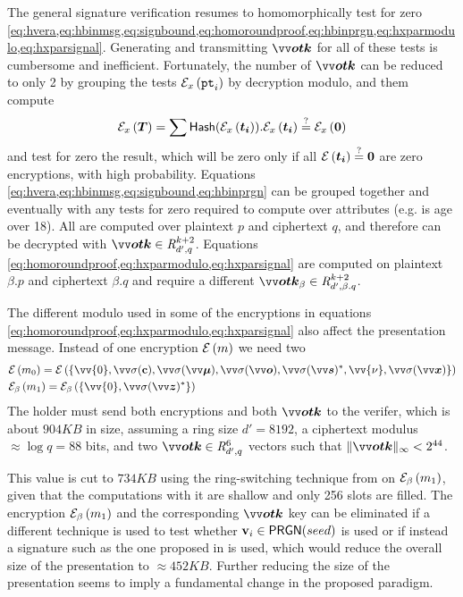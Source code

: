 The general signature verification resumes to homomorphically test for zero \cref{eq:hvera,eq:hbinmsg,eq:signbound,eq:homoroundproof,eq:hbinprgn,eq:hxparmodulo,eq:hxparsignal}. Generating and transmitting $\pv{otk}$ for all of these tests is cumbersome and inefficient. Fortunately, the number of $\pv{otk}$ can be reduced to only 2 by grouping the tests $\senc{\pt_i}{x}$ by decryption modulo, and them compute
\[\senc{\p{T}}{x}=\sum \textsf{Hash}(\senc{\p{t_i}}{x}).\senc{\p{t_i}}{x}\stackrel{?}{=} \senc{\p{0}}{x}\]
and test for zero the result, which will be zero only if all $\enc{\p{t_i}}\stackrel{?}{=} \p{0}$ are zero encryptions, with high probability\cite{lyubashevskyLatticeBasedZeroKnowledgeProofs2022}.  Equations \cref{eq:hvera,eq:hbinmsg,eq:signbound,eq:hbinprgn} can be grouped together and eventually with any tests for zero required to compute over attributes (e.g. is age over 18). All are computed over plaintext $p$ and ciphertext $q$, and therefore can be decrypted with $\pv{otk} \in \intring^{k+2}_{d',q}$. Equations \cref{eq:homoroundproof,eq:hxparmodulo,eq:hxparsignal} are computed on plaintext $\beta.p$ and ciphertext $\beta.q$ and require a different $\pv{otk}_{\beta} \in \intring^{k+2}_{d',\beta.q}$.

The different modulo used in some of the encryptions in equations \cref{eq:homoroundproof,eq:hxparmodulo,eq:hxparsignal} also affect the presentation message. Instead of one encryption $\enc{m}$ we need two
\begin{align*}
 &\enc{m_0} = \enc{\{\vv{0},\cd{\pc}, \cdv{\mu}, \cdv{o}, \cdv{s}^*, \vv{\nu}, \cdv{x}\}} \\
 &\senc{m_1}{\beta} = \senc{\{\vv{0},\cdv{z}^*\}}{\beta}  
\end{align*}
The holder must send both encryptions and both $\pv{otk}$ to the verifer, which is about $904KB$ in size, assuming a ring size $d'=8192$, a ciphertext modulus $\approx\log q=88$ bits, and two $\pv{otk} \in \intring^6_{d',q}$ vectors such that $\|\pv{otk}\|_{\infty} < 2^{44}$.


This value is cut to $734KB$ using the ring-switching technique from \cite{gentryRingSwitchingBGVStyle2012} on $\senc{m_1}{\beta}$, given that the computations with it are shallow and only 256 slots are filled. The encryption $\senc{m_1}{\beta}$ and the corresponding $\pv{otk}$ key can be eliminated if a different technique is used to test whether $\pvv_i \in \mathsf{PRGN}(seed)$ is used or if instead a signature such as the one proposed in \cite{bootleFrameworkPracticalAnonymous2023} is used, which would reduce the overall size of the presentation to $\approx 452KB$. Further reducing the size of the presentation seems to imply a fundamental change in the proposed paradigm.